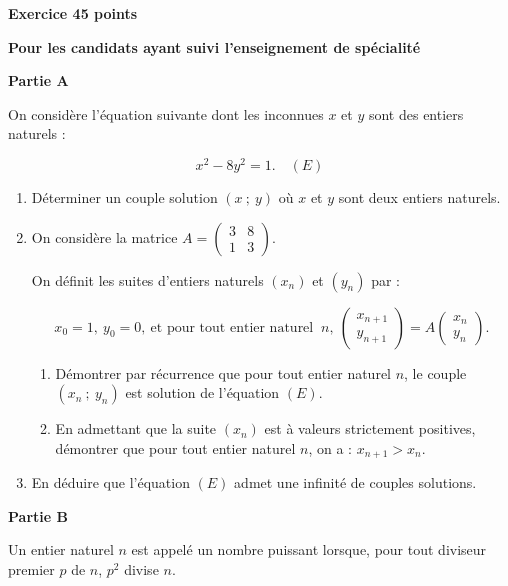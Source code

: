 \documentclass[10pt,a4paper]{article}
\begin{document}
\vspace{0,5cm}

\textbf{Exercice 4\hfill 5 points}

\textbf{Pour les candidats ayant suivi l'enseignement de spécialité}

\bigskip

\textbf{Partie A}

\medskip

On considère l'équation suivante dont les inconnues $x$ et $y$ sont des entiers naturels :

\[x^2 - 8y^2 = 1 . \quad(E)\]

\medskip

\begin{enumerate}
\item Déterminer un couple solution $(x~;~y)$ où $x$ et $y$ sont deux entiers naturels.
\item On considère la matrice $A = \begin{pmatrix}3&8\\1&3\end{pmatrix}$.

On définit les suites d'entiers naturels $\left(x_n\right)$ et $\left(y_n\right)$ par :

\[x_0 = 1,\: y_0 = 0,\: \text{et pour tout entier naturel }\:n,\: \begin{pmatrix}x_{n+1}\\y_{n+1}\end{pmatrix} = A\begin{pmatrix}x_{n}\\y_{n}\end{pmatrix}.\]
	\begin{enumerate}
		\item Démontrer par récurrence que pour tout entier naturel $n$, le couple 
		$\left(x_n~;~y_n\right)$ est solution de l'équation $(E)$.
		\item En admettant que la suite $\left(x_n\right)$ est à valeurs strictement positives, démontrer que pour tout entier naturel $n$, on a : $x_{n+1} > x_n$.
 	\end{enumerate}
\item  En déduire que l'équation $(E)$ admet une infinité de couples solutions.
\end{enumerate}

\bigskip

\textbf{Partie B}

\medskip

Un entier naturel $n$ est appelé un nombre puissant lorsque, pour tout diviseur premier $p$ de $n$,\: $p^2$ divise $n$.
\end{document}
